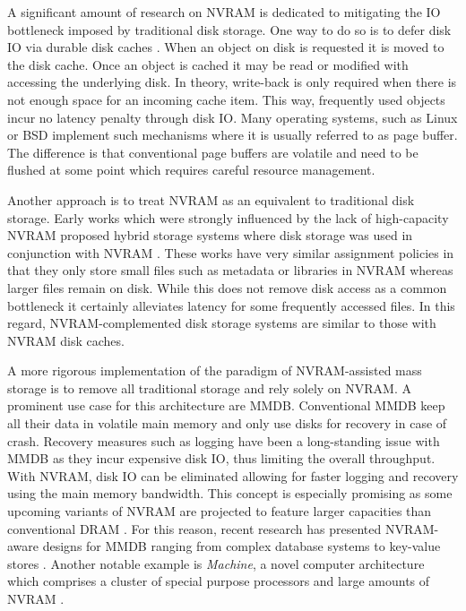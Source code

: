 A significant amount of research on NVRAM is dedicated to mitigating the IO
bottleneck imposed by traditional disk storage. One way to do so is to defer
disk IO via durable disk caches \cite{chen1996rio, wu1994envy}. When an object
on disk is requested it is moved to the disk cache. Once an object is cached it
may be read or modified with accessing the underlying disk. In theory,
write-back is only required when there is not enough space for an incoming cache
item. This way, frequently used objects incur no latency penalty through disk
IO. Many operating systems, such as Linux or BSD implement such mechanisms where
it is usually referred to as page buffer. The difference is that conventional
page buffers are volatile and need to be flushed at some point which requires
careful resource management.

Another approach is to treat NVRAM as an equivalent to traditional disk storage.
Early works which were strongly influenced by the lack of high-capacity NVRAM
proposed hybrid storage systems where disk storage was used in conjunction with
NVRAM \cite{wang2002conquest, miller2001hermes}. These works have very similar
assignment policies in that they only store small files such as  metadata or
libraries in NVRAM whereas larger files remain on disk. While this does not
remove disk access as a common bottleneck it certainly alleviates latency for
some frequently accessed files. In this regard, NVRAM-complemented disk storage
systems are similar to those with NVRAM disk caches.

A more rigorous implementation of the paradigm of NVRAM-assisted mass storage is
to remove all traditional storage and rely solely on NVRAM. A prominent use case
for this architecture are MMDB. Conventional MMDB keep all their data in
volatile main memory and only use disks for recovery in case of crash. Recovery
measures such as logging have been a long-standing issue with MMDB as they incur
expensive disk IO, thus limiting the overall throughput. With NVRAM, disk IO can
be eliminated allowing for faster logging and recovery using the main memory
bandwidth. This concept is especially promising as some upcoming variants of
NVRAM are projected to feature larger capacities than conventional DRAM
\cite{lee2009architecting, zilberberg2013phase, dulloor2014system}. For this
reason, recent research has presented NVRAM-aware designs for MMDB ranging from
complex database systems \cite{oukid2015instant, schwalb2016hyrise} to key-value
stores \cite{bailey2013exploring, zhou2016nvht, wu2016nvmcached}. Another
notable example is \emph{Machine}, a novel computer architecture which comprises
a cluster of special purpose processors and large amounts of NVRAM
\cite{courtland2016can}.

